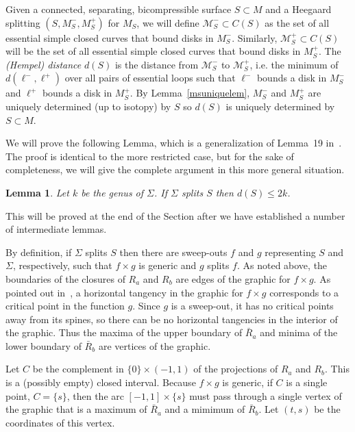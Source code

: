 \documentclass[12pt]{amsart}
\theoremstyle{plain}
\newtheorem{Lem}[Thm]{Lemma}
\theoremstyle{definition}
\begin{document}
Given a connected, separating, bicompressible surface $S \subset M$ and a Heegaard splitting $(S, M_S^-, M_S^+)$ for $M_S$, we will define $\mathcal{M}_S^- \subset C(S)$ as the set of all essential simple closed curves that bound disks in $M_S^-$.  Similarly, $\mathcal{M}_S^+ \subset C(S)$ will be the set of all essential simple closed curves that bound disks in $M_S^+$.  The \textit{(Hempel) distance} $d(S)$ is the distance from $\mathcal{M}_S^-$ to $\mathcal{M}_S^+$, i.e. the minimum of $d(\ell^-, \ell^+)$ over all pairs of essential loops such that $\ell^-$ bounds a disk in $M_S^-$ and $\ell^+$ bounds a disk in $M_S^+$.  By Lemma~\ref{msuniquelem}, $M_S^-$ and $M_S^+$ are uniquely determined (up to isotopy) by $S$ so $d(S)$ is uniquely determined by $S \subset M$.

We will prove the following Lemma, which is a generalization of Lemma~19 in~\cite{me:stabs}.  The proof is identical to the more restricted case, but for the sake of completeness, we will give the complete argument in this more general situation.

\begin{Lem}
\label{splitlem}
Let $k$ be the genus of $\Sigma$.  If $\Sigma$ splits $S$ then $d(S) \leq 2k$.
\end{Lem}

This will be proved at the end of the Section after we have established a number of intermediate lemmas.

By definition, if $\Sigma$ splits $S$ then there are sweep-outs $f$ and $g$ representing $S$ and $\Sigma$, respectively, such that $f \times g$ is generic and $g$ splits $f$.  As noted above, the boundaries of the closures of $R_a$ and $R_b$ are edges of the graphic for $f \times g$.  As pointed out in~\cite{inflects}, a horizontal tangency in the graphic for $f \times g$ corresponds to a critical point in the function $g$.  Since $g$ is a sweep-out, it has no critical points away from its spines, so there can be no horizontal tangencies in the interior of the graphic.  Thus the maxima of the upper boundary of $\bar R_a$ and minima of the lower boundary of $\bar R_b$ are vertices of the graphic.  

Let $C$ be the complement in $\{0\} \times (-1,1)$ of the projections of $R_a$ and $R_b$.  This is a (possibly empty) closed interval.  Because $f \times g$ is generic, if $C$ is a single point, $C = \{s\}$, then the arc $[-1,1] \times \{s\}$ must pass through a single vertex of the graphic that is a maximum of $\bar R_a$ and a mimimum of $\bar R_b$.  Let $(t, s)$ be the coordinates of this vertex.  
\end{document}
